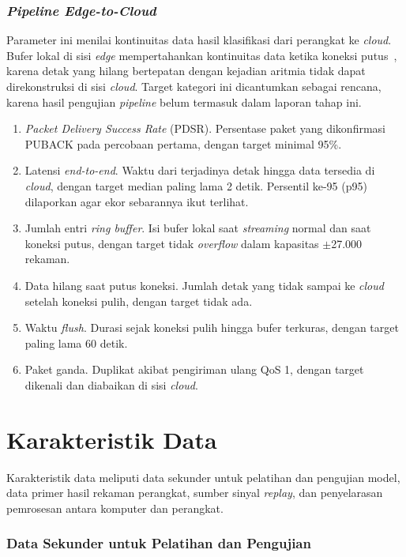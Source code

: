 \subsubsection{\textit{Pipeline Edge-to-Cloud}}

Parameter ini menilai kontinuitas data hasil klasifikasi dari perangkat ke \textit{cloud}. Bufer lokal di sisi \textit{edge} mempertahankan kontinuitas data ketika koneksi putus~\cite{escobedo_2026, tipparaju_2021}, karena detak yang hilang bertepatan dengan kejadian aritmia tidak dapat direkonstruksi di sisi \textit{cloud}. Target kategori ini dicantumkan sebagai rencana, karena hasil pengujian \textit{pipeline} belum termasuk dalam laporan tahap ini.
\begin{enumerate}[label=\arabic*)]
  \item \textit{Packet Delivery Success Rate} (PDSR). Persentase paket yang dikonfirmasi PUBACK pada percobaan pertama, dengan target minimal 95\%.
  \item Latensi \textit{end-to-end}. Waktu dari terjadinya detak hingga data tersedia di \textit{cloud}, dengan target median paling lama 2 detik. Persentil ke-95 (p95) dilaporkan agar ekor sebarannya ikut terlihat.
  \item Jumlah entri \textit{ring buffer}. Isi bufer lokal saat \textit{streaming} normal dan saat koneksi putus, dengan target tidak \textit{overflow} dalam kapasitas $\pm$27.000 rekaman.
  \item Data hilang saat putus koneksi. Jumlah detak yang tidak sampai ke \textit{cloud} setelah koneksi pulih, dengan target tidak ada.
  \item Waktu \textit{flush}. Durasi sejak koneksi pulih hingga bufer terkuras, dengan target paling lama 60 detik.
  \item Paket ganda. Duplikat akibat pengiriman ulang QoS 1, dengan target dikenali dan diabaikan di sisi \textit{cloud}.
\end{enumerate}

\section{Karakteristik Data}

Karakteristik data meliputi data sekunder untuk pelatihan dan pengujian model, data primer hasil rekaman perangkat, sumber sinyal \textit{replay}, dan penyelarasan pemrosesan antara komputer dan perangkat.

\subsubsection{Data Sekunder untuk Pelatihan dan Pengujian}

